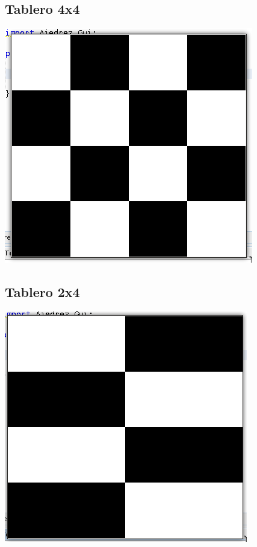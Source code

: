 \documentclass[12pt]{article}
\begin{document}
\subsection*{Tablero 4x4}

\includegraphics[width=\textwidth]{Corrida2.png}

\subsection*{Tablero 2x4}

\includegraphics[width=\textwidth]{Corrida3.png}
\end{document}
